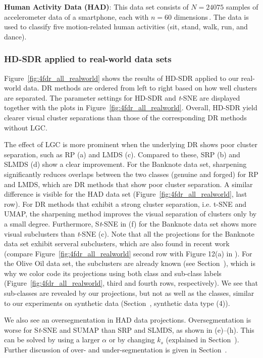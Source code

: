 \documentclass[sagev,Afour,times]{sagej}
\begin{document}
\noindent\textbf{Human Activity Data (HAD)}: This data set consists of $N=24075$ samples of accelerometer data of a smartphone, each with $n=60$ dimensions\,\cite{realworld:humanActivity,realworld:humanActivity2:calibration,realworld:humanActivity3:feature}. The data is used to classify five motion-related human activities (sit, stand, walk, run, and dance).

\subsubsection{HD-SDR applied to real-world data sets}
%
Figure~\ref{fig:4fdr_all_realworld} shows the results of HD-SDR applied to our real-world data. DR methods are ordered from left to right based on how well clusters are separated. The parameter settings for HD-SDR and \emph{t}-SNE are displayed together with the plots in Figure~\ref{fig:4fdr_all_realworld}. Overall, HD-SDR yield clearer visual cluster separations than those of the corresponding DR methods without LGC. 

The effect of LGC is more prominent when the underlying DR shows poor cluster separation, such as RP (a) and LMDS (c). Compared to these, SRP (b) and SLMDS (d) show a clear improvement. For the Banknote data set, sharpening significantly reduces overlaps between the two classes (genuine and forged) for RP and LMDS, which are DR methods that show poor cluster separation. A similar difference is visible for the HAD data set (Figure~\ref{fig:4fdr_all_realworld}, last row). For DR methods that exhibit a strong cluster separation, i.e. {t}-SNE and UMAP, the sharpening method improves the visual separation of clusters only by a small degree. 
Furthermore, S\emph{t}-SNE in (f) for the Banknote data set shows more visual subclusters than \emph{t}-SNE (c). Note that all the projections for the Banknote data set exhibit serveral subclusters, which are also found in recent work (compare Figure~\ref{fig:4fdr_all_realworld} second row with Figure 12(a) in \cite{realworld:banknote_sep}). For the Olive Oil data set, the subclusters are already known (see Section~), 
which is why we color code its projections using both class and sub-class labels (Figure~\ref{fig:4fdr_all_realworld}, third and fourth rows, respectively). We see that sub-classes are revealed by our projections, but not as well as the classes, similar to our experiments on synthetic data (Section~, synthetic data type (4)).

We also see an oversegmentation in HAD data projections. Oversegmentation is worse for S\emph{t}-SNE and SUMAP than SRP and SLMDS, as shown in (e)--(h). This can be solved by using a larger $\alpha$ or by changing $k_s$ (explained in Section~). Further discussion of over- and under-segmentation is given in Section~.
\end{document}
